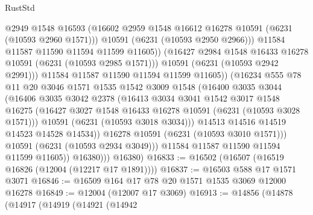 \begin{lexlean}{RustStd}
\begin{coremodule}
{{                              @2949
                              @1548
                              @16593
                              (@16602 @2959 @1548 @16612 @16278 @10591 (@6231 (@10593 @2960 @1571)))
                              @10591
                              (@6231 (@10593 @2950 @2966)))
                            @11584
                            @11587
                            @11590
                            @11594
                            @11599
                            @11605))
                        (@16427 @2984 @1548 @16433 @16278 @10591 (@6231 (@10593 @2985 @1571)))
                        @10591
                        (@6231 (@10593 @2942 @2991)))
                      @11584
                      @11587
                      @11590
                      @11594
                      @11599
                      @11605))
                  (@16234
                    @555
                    @78
                    @11
                    @20
                    @3046
                    @1571
                    @1535
                    @1542
                    @3009
                    @1548
                    (@16400
                      @3035
                      @3044
                      (@16406
                        @3035
                        @3042
                        @2378
                        (@16413
                          @3034
                          @3041
                          @1542
                          @3017
                          @1548
                          @16275
                          (@16427 @3027 @1548 @16433 @16278 @10591 (@6231 (@10593 @3028 @1571)))
                          @10591
                          (@6231 (@10593 @3018 @3034)))
                        @14513
                        @14516
                        @14519
                        @14523
                        @14528
                        @14534))
                    @16278
                    @10591
                    (@6231 (@10593 @3010 @1571)))
                  @10591
                  (@6231 (@10593 @2934 @3049)))
                @11584
                @11587
                @11590
                @11594
                @11599
                @11605))
            @16380)))
      @16380)
@16833 := @16502 (@16507 (@16519 @16826 (@12004 (@12217 @17 @1891))))
@16837 := @16503 @588 @17 @1571 @3071
@16846 := @16509 @164 @17 @78 @20 @1571 @1535 @3069 @12000 @16278
@16849 := @12004 (@12007 @17 @3069)
@16913 := @14856
    (@14878
      (@14917
        (@14919
          (@14921
            (@14942
}}
\end{coremodule}
\end{lexlean}
